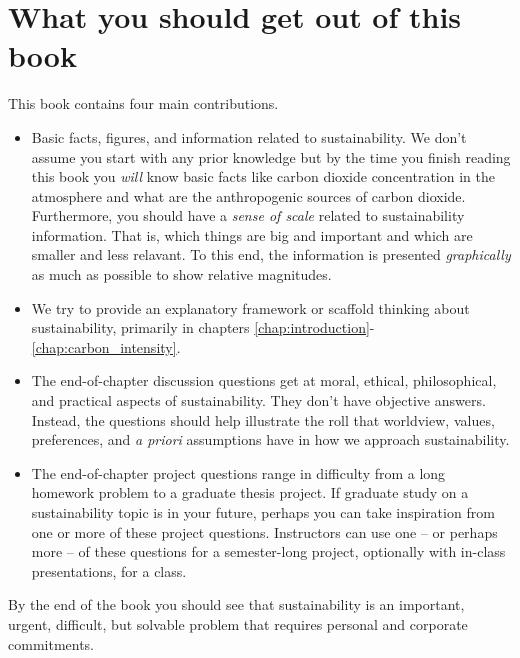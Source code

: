 {\section*{What you should get out of this book} This book contains four main 
contributions.
\begin{itemize}
\item Basic facts, figures, and information related to sustainability. 
We don't assume you start with any prior knowledge but by the time you finish 
reading this book you \emph{will} know basic facts like carbon dioxide 
concentration in the atmosphere and what are the anthropogenic sources of 
carbon dioxide. 
Furthermore, you should have a \emph{sense of scale} related to sustainability 
information. 
That is, which things are big and important and which are smaller and less relavant. 
To this end, the information is presented \emph{graphically} as much as possible 
to show relative magnitudes.
\item We try to provide an explanatory framework or scaffold thinking about sustainability,
primarily in chapters \ref{chap:introduction}-\ref{chap:carbon_intensity}.
\item The end-of-chapter discussion questions get at moral, ethical, philosophical,
and practical aspects of sustainability. They don't have %
objective answers. 
Instead, the questions should help illustrate the roll that worldview, values, 
preferences, and \emph{a priori} assumptions have in how we approach sustainability. 
\item The end-of-chapter project questions range in difficulty from a long
homework problem to a graduate thesis project. If graduate study on a sustainability
topic is in your future, perhaps you can take inspiration from one or more of 
these project questions. Instructors can use one -- or perhaps more -- of these 
questions for a semester-long project, optionally with in-class presentations, for a class.
\end{itemize}
By the end of the book you should see that sustainability is an important, 
urgent, difficult, but solvable problem that requires personal and corporate 
commitments. \\

}
